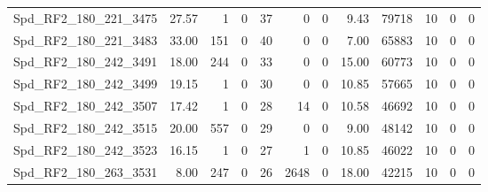 \begin{longtable}[c]{@{}lrrrrrrrrrrr@{}}
Spd\_RF2\_180\_221\_3475     & 27.57                  & 1                       & 0                       & 37                     & 0                       & 0                       & 9.43                    & 79718                    & 10                       & 0                        & 0                        \\
Spd\_RF2\_180\_221\_3483     & 33.00                  & 151                     & 0                       & 40                     & 0                       & 0                       & 7.00                    & 65883                    & 10                       & 0                        & 0                        \\
Spd\_RF2\_180\_242\_3491     & 18.00                  & 244                     & 0                       & 33                     & 0                       & 0                       & 15.00                   & 60773                    & 10                       & 0                        & 0                        \\
Spd\_RF2\_180\_242\_3499     & 19.15                  & 1                       & 0                       & 30                     & 0                       & 0                       & 10.85                   & 57665                    & 10                       & 0                        & 0                        \\
Spd\_RF2\_180\_242\_3507     & 17.42                  & 1                       & 0                       & 28                     & 14                      & 0                       & 10.58                   & 46692                    & 10                       & 0                        & 0                        \\
Spd\_RF2\_180\_242\_3515     & 20.00                  & 557                     & 0                       & 29                     & 0                       & 0                       & 9.00                    & 48142                    & 10                       & 0                        & 0                        \\
Spd\_RF2\_180\_242\_3523     & 16.15                  & 1                       & 0                       & 27                     & 1                       & 0                       & 10.85                   & 46022                    & 10                       & 0                        & 0                        \\
Spd\_RF2\_180\_263\_3531     & 8.00                   & 247                     & 0                       & 26                     & 2648                    & 0                       & 18.00                   & 42215                    & 10                       & 0                        & 0                        \\

\end{longtable}

